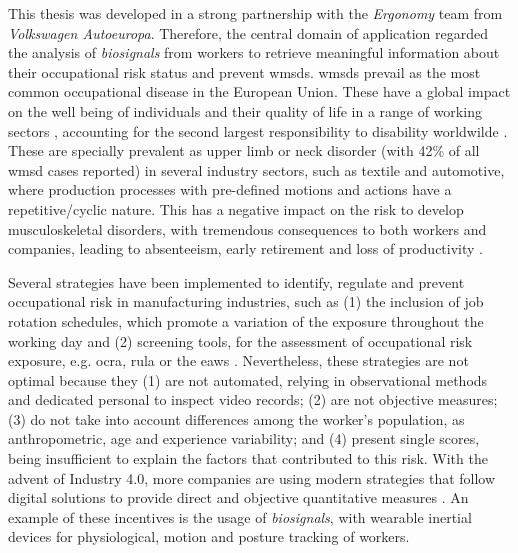 This thesis was developed in a strong partnership with the \textit{Ergonomy} team from \textit{Volkswagen Autoeuropa}. Therefore, the central domain of application regarded the analysis of \textit{biosignals} from workers to retrieve meaningful information about their occupational risk status and prevent \gls{wmsd}s. \gls{wmsd}s prevail as the most common occupational disease in the European Union. These have a global impact on the well being of individuals and their quality of life in a range of working sectors \cite{Irastorza2010}, accounting for the second largest responsibility to disability worldwilde \cite{Luttmann2003}. These are specially prevalent as upper limb or neck disorder (with 42\% of all \gls{wmsd} cases reported) \cite{Seidel2019} in several industry sectors, such as textile and automotive, where production processes with pre-defined motions and actions have a repetitive/cyclic nature. This has a negative impact on the risk to develop musculoskeletal disorders, with tremendous consequences to both workers and companies, leading to absenteeism, early retirement and loss of productivity \cite{Trabalhadores, Varandas19}. 

Several strategies have been implemented to identify, regulate and prevent occupational risk in manufacturing industries, such as (1) the inclusion of job rotation schedules, which promote a variation of the exposure throughout the working day \cite{jobrotation1, jobrotation2} and (2) screening tools, for the assessment of occupational risk exposure, e.g. \gls{ocra}, \gls{rula} or the \gls{eaws} \cite{ocra, rula, eaws}. Nevertheless, these strategies are not optimal because they (1) are not automated, relying in observational methods and dedicated personal to inspect video records; (2) are not objective measures; (3) do not take into account differences among the worker's population, as anthropometric, age and experience variability; and (4) present single scores, being insufficient to explain the factors that contributed to this risk. With the advent of Industry 4.0, more companies are using modern strategies that follow digital solutions to provide direct and objective quantitative measures \cite{romero}. An example of these incentives is the usage of \textit{biosignals}, with wearable inertial devices for physiological, motion and posture tracking of workers.

